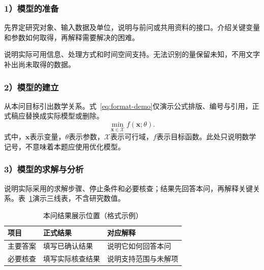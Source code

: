 \subsubsection*{1）模型的准备}
先界定研究对象、输入数据及单位，说明与前问或共用资料的接口。介绍关键变量和参数如何取得，再解释需要解决的困难。

\noindent\hspace*{2em}
说明实际可用信息、处理方式和时间空间支持。无法识别的量保留未知，不用文字补出尚未取得的数据。

\subsubsection*{2）模型的建立}
从本问目标引出数学关系。式~\eqref{eq:format-demo}仅演示公式排版、编号与引用，正式稿应替换成实际模型或删除。
\begin{equation}
\min_{\mathbf{x}\in\mathcal{X}} f(\mathbf{x};\theta).
\label{eq:format-demo}
\end{equation}
式中，$\mathbf{x}$表示变量，$\theta$表示参数，$\mathcal{X}$表示可行域，$f$表示目标函数。此处只说明数学记号，不意味着本题应使用优化模型。

\subsubsection*{3）模型的求解与分析}
说明实际采用的求解步骤、停止条件和必要核查；结果先回答本问，再解释关键关系。表~\ref{tab:q1-demo}演示三线表，不含研究数值。
\begin{table}[htbp]
\centering
\caption{本问结果展示位置（格式示例）}\label{tab:q1-demo}
\fontsize{9.5}{12}\selectfont
\setlength{\tabcolsep}{4pt}
\begin{tabularx}{\textwidth}{p{25mm}X X}
\toprule
项目 & 正式结果 & 对应解释 \\
\midrule
主要答案 & 填写已确认结果 & 说明它如何回答本问 \\
必要核查 & 填写实际核查结果 & 说明支持范围与未解项 \\
\bottomrule
\end{tabularx}
\end{table}
\FloatBarrier
